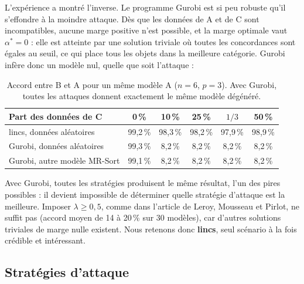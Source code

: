 \documentclass[11pt,a4paper]{article}
\begin{document}
L'expérience a montré l'inverse. Le programme Gurobi est si peu robuste qu'il s'effondre à la moindre attaque.
Dès que les données de A et de C sont incompatibles, aucune marge positive n'est possible, et la marge optimale
vaut $\alpha^* = 0$ : elle est atteinte par une solution triviale où toutes les concordances sont égales au
seuil, ce qui place tous les objets dans la meilleure catégorie. Gurobi infère donc un modèle nul, quelle que
soit l'attaque :

\begin{table}[h]
\centering
\begin{tabularx}{\textwidth}{>{\raggedright\arraybackslash}p{5.2cm}CCCCC}
\toprule
Part des données de C & 0\,\% & 10\,\% & 25\,\% & $1/3$ & 50\,\% \\
\midrule
lincs, données aléatoires   & 99,2\,\% & 98,3\,\% & 98,2\,\% & 97,9\,\% & 98,9\,\% \\
Gurobi, données aléatoires  & 99,3\,\% & 8,2\,\%  & 8,2\,\%  & 8,2\,\%  & 8,2\,\% \\
Gurobi, autre modèle MR-Sort & 99,1\,\% & 8,2\,\% & 8,2\,\%  & 8,2\,\%  & 8,2\,\% \\
\bottomrule
\end{tabularx}
\caption{Accord entre B et A pour un même modèle A ($n=6$, $p=3$). Avec Gurobi, toutes les attaques donnent
exactement le même modèle dégénéré.}
\label{tab:algo}
\end{table}

Avec Gurobi, toutes les stratégies produisent le même résultat, l'un des pires possibles : il devient
impossible de déterminer quelle stratégie d'attaque est la meilleure. Imposer $\lambda \ge 0{,}5$, comme dans
l'article de Leroy, Mousseau et Pirlot, ne suffit pas (accord moyen de 14 à 20\,\% sur 30 modèles), car
d'autres solutions triviales de marge nulle existent. Nous retenons donc \textbf{lincs}, seul scénario à la
fois crédible et intéressant.

\subsection{Stratégies d'attaque}
\end{document}

